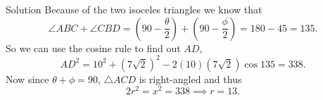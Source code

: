 \documentclass{article}
\begin{document}
\begin{solution}{Solution}
Because of the two isoceles triangles we know that
$$
\angle ABC + \angle CBD = \left(90 - \frac{\theta}{2}\right) +
                          \left(90 - \frac{\phi}{2}\right)
                        = 180 - 45 = 135.
$$
So we can use the cosine rule to find out $AD$,
$$
AD^2 = 10^2 + (7\sqrt2)^2 - 2(10)(7\sqrt2)\cos135 = 338.
$$
Now since $\theta + \phi = 90$, $\triangle ACD$ is right-angled and thus
$$
2r^2 = x^2 = 338 \implies r = \boxed{13}.
$$

\end{solution}
\end{document}
